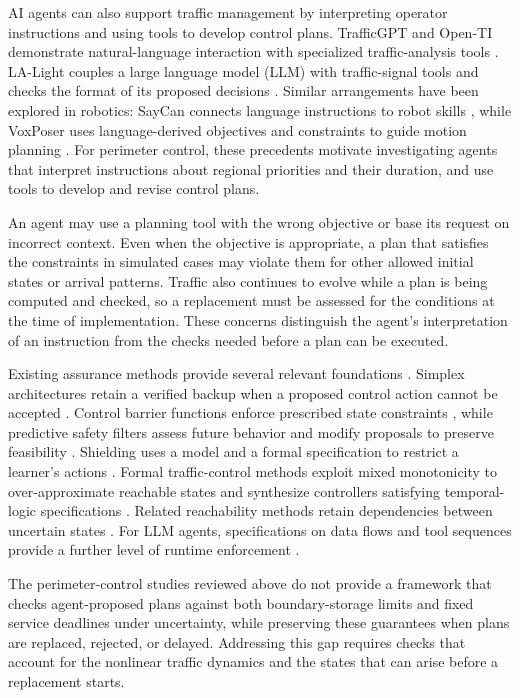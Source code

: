 \documentclass[preprint,12pt]{elsarticle}
\theoremstyle{definition}
\theoremstyle{plain}
\theoremstyle{definition}
\theoremstyle{plain}
\begin{document}
AI agents can also support traffic management by interpreting operator
instructions and using tools to develop control plans. TrafficGPT and
Open-TI demonstrate natural-language interaction with specialized
traffic-analysis tools \cite{trafficgpt2024,openti2024}. LA-Light couples
a large language model (LLM) with traffic-signal tools and checks the format of its proposed
decisions \cite{wang2024lalight}. Similar arrangements have been explored in robotics: SayCan connects language
instructions to robot skills \cite{saycan2023}, while VoxPoser uses
language-derived objectives and constraints to guide motion planning
\cite{voxposer2023}. For perimeter control, these precedents motivate
investigating agents that interpret instructions about regional priorities
and their duration, and use tools to develop and revise control plans.

An agent may use a planning tool with the wrong objective or base its
request on incorrect context. Even when the objective is appropriate, a
plan that satisfies the constraints in simulated cases may violate them
for other allowed initial states or arrival patterns. Traffic also
continues to evolve while a plan is being computed and checked, so a
replacement must be assessed for the conditions at the time of
implementation. These concerns distinguish the agent's interpretation of
an instruction from the checks needed before a plan can be executed.

Existing assurance methods provide several relevant foundations
\cite{hobbs2023runtime}. Simplex architectures retain a verified backup
when a proposed control action cannot be accepted \cite{mehmood2022black}.
Control barrier functions enforce prescribed state constraints
\cite{ames2017}, while predictive safety filters assess future behavior
and modify proposals to preserve feasibility \cite{wabersich2021}.
Shielding uses a model and a formal specification to restrict a learner's
actions \cite{alshiekh2018}. Formal traffic-control methods exploit mixed
monotonicity to over-approximate reachable states and synthesize controllers
satisfying temporal-logic specifications \cite{coogan2017formal}.
Related reachability methods retain dependencies between uncertain states
\cite{coogan2020mixed,kochdumper2021sparse}. For LLM agents, specifications
on data flows and tool sequences provide a further level of runtime
enforcement \cite{doshi2026tools}.

The perimeter-control studies reviewed above do not provide a framework
that checks agent-proposed plans against both boundary-storage limits and
fixed service deadlines under uncertainty, while preserving these
guarantees when plans are replaced, rejected, or delayed. Addressing this
gap requires checks that account for the nonlinear traffic dynamics and
the states that can arise before a replacement starts.
\end{document}
